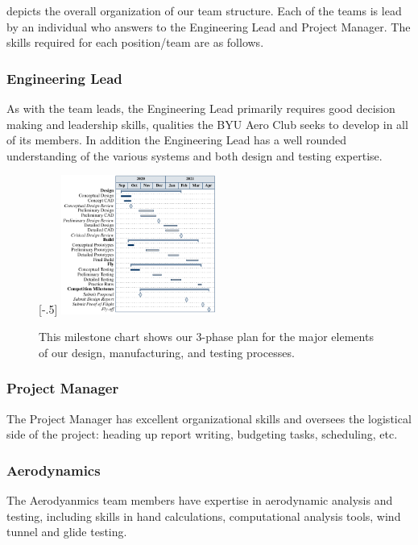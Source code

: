\documentclass[proposal]{byu-aero}
\begin{document}


 depicts the overall organization of our team structure.  Each of the teams is lead by an individual who answers to the Engineering Lead and Project Manager.  The skills required for each position/team are as follows.




\subsubsection{Engineering Lead} As with the team leads, the Engineering Lead primarily requires good decision making and leadership skills, qualities the BYU Aero Club seeks to develop in all of its members.  In addition the Engineering Lead has a well rounded understanding of the various systems and both design and testing expertise.
\begin{figure}
	\centering
	\raisebox{0pt}[\dimexpr\height-.5\baselineskip\relax]{
	\includegraphics[width=0.45\textwidth]{ganttchart.pdf}}
	\caption{This milestone chart shows our 3-phase plan for the major elements of our design, manufacturing, and testing processes.}
	\label{fig:plannedtiming}
\end{figure}
\subsubsection{Project Manager} The Project Manager has excellent organizational skills  and oversees the logistical side of the project: heading up report writing, budgeting tasks, scheduling, etc.
\subsubsection{Aerodynamics} The Aerodyanmics team members have expertise in aerodynamic analysis and testing, including skills in hand calculations, computational analysis tools, wind tunnel and glide testing.
\end{document}
